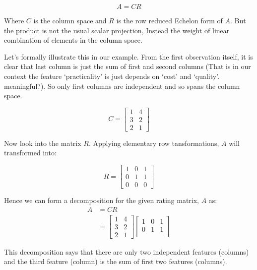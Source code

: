 \documentclass[
  letterpaper,
  DIV=11,
  numbers=noendperiod]{scrreprt}
\theoremstyle{plain}
\theoremstyle{definition}
\theoremstyle{remark}
\begin{document}
\begin{tcolorbox}
\[A=CR\]

Where \(C\) is the column space and \(R\) is the row reduced Echelon
form of \(A\). But the product is not the usual scalar projection,
Instead the weight of linear combination of elements in the column
space.

Let's formally illustrate this in our example. From the first
observation itself, it is clear that last column is just the sum of
first and second columns (That is in our context the feature
`practicality' is just depends on `cost' and `quality'. meaningful?). So
only first columns are independent and so spans the column space.

\[C=\begin{bmatrix}1&4\\3&2\\2&1\end{bmatrix}\]

Now look into the matrix \(R\). Applying elementary row tansformations,
\(A\) will transformed into:

\[R=\begin{bmatrix}1&0&1\\0&1&1\\0&0&0\end{bmatrix}\]

Hence we can form a decomposition for the given rating matrix, \(A\) as:
\begin{align*}
A&=CR\\
&=\begin{bmatrix}1&4\\3&2\\2&1\end{bmatrix}\begin{bmatrix}1&0&1\\0&1&1\\\mbox{}&&\end{bmatrix}
\end{align*}

This decomposition says that there are only two independent features
(columns) and the third feature (column) is the sum of first two
features (columns).

\begin{tcolorbox}[enhanced jigsaw, breakable, left=2mm, arc=.35mm, bottomtitle=1mm, leftrule=.75mm, titlerule=0mm, toprule=.15mm, opacitybacktitle=0.6, title=\textcolor{quarto-callout-important-color}{\faExclamation}\hspace{0.5em}{Interpretation of the \(R\) matrix}, colback=white, colframe=quarto-callout-important-color-frame, coltitle=black, bottomrule=.15mm, toptitle=1mm, rightrule=.15mm, opacityback=0, colbacktitle=quarto-callout-important-color!10!white]


\end{tcolorbox}
\end{tcolorbox}
\end{document}
